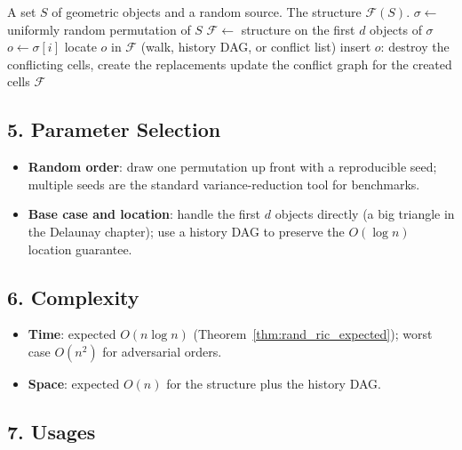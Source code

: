 \begin{algorithm}[htbp]
\caption{Generic Randomized Incremental Construction}
\label{alg:rand_ric_generic}
\begin{algorithmic}[1]
\Require A set $S$ of geometric objects and a random source.
\Ensure The structure $\mathcal{F}(S)$.
  \State $\sigma \gets$ uniformly random permutation of $S$
  \State $\mathcal{F} \gets$ structure on the first $d$ objects of $\sigma$
    \State $o \gets \sigma[i]$
    \State locate $o$ in $\mathcal{F}$ (walk, history DAG, or conflict list)
    \State insert $o$: destroy the conflicting cells, create the replacements
    \State update the conflict graph for the created cells
  \EndFor
  \State \Return $\mathcal{F}$
\EndFunction
\end{algorithmic}
\end{algorithm}

\subsection{5. Parameter Selection}

\begin{itemize}
\item \textbf{Random order}: draw one permutation up front with a reproducible
  seed; multiple seeds are the standard variance-reduction tool for benchmarks.
\item \textbf{Base case and location}: handle the first $d$ objects directly
  (a big triangle in the Delaunay chapter); use a history DAG to preserve the
  $O(\log n)$ location guarantee.
\end{itemize}

\subsection{6. Complexity}

\begin{itemize}
\item \textbf{Time}: expected $O(n \log n)$ (Theorem~\ref{thm:rand_ric_expected});
  worst case $O(n^2)$ for adversarial orders.
\item \textbf{Space}: expected $O(n)$ for the structure plus the history DAG.
\end{itemize}

\subsection{7. Usages}

